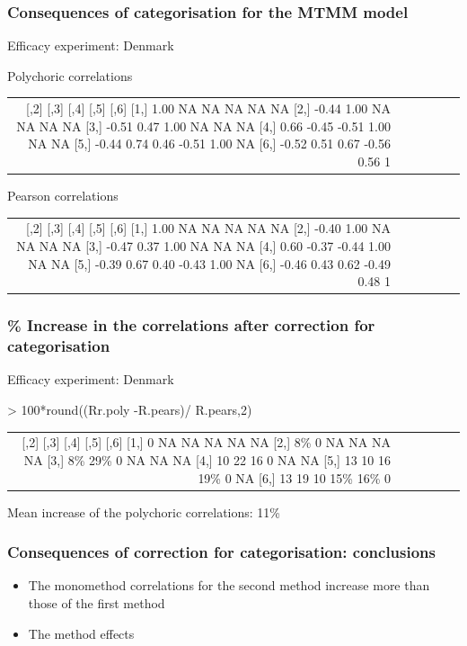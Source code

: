 \documentclass{beamer}
\begin{document}
\begin{frame}
\frametitle{Consequences of categorisation for the MTMM model}

Efficacy experiment: Denmark

Polychoric correlations

\begin{tabular}{rrrrrr}
 \hline
      [,1]  [,2]  [,3]  [,4] [,5] [,6]
[1,]  1.00    NA    NA    NA   NA   NA
[2,] -0.44  1.00    NA    NA   NA   NA
[3,] -0.51  0.47  1.00    NA   NA   NA
[4,]  0.66 -0.45 -0.51  1.00   NA   NA
[5,] -0.44  0.74  0.46 -0.51 1.00   NA
[6,] -0.52  0.51  0.67 -0.56 0.56    1
 \hline
 \end{tabular} 
 
Pearson correlations

\begin{tabular}{rrrrrr}
 \hline
      [,1]  [,2]  [,3]  [,4] [,5] [,6]
[1,]  1.00    NA    NA    NA   NA   NA
[2,] -0.40  1.00    NA    NA   NA   NA
[3,] -0.47  0.37  1.00    NA   NA   NA
[4,]  0.60 -0.37 -0.44  1.00   NA   NA
[5,] -0.39  0.67  0.40 -0.43 1.00   NA
[6,] -0.46  0.43  0.62 -0.49 0.48    1
 \hline
 \end{tabular}
\end{frame}

\begin{frame}
\frametitle{\% Increase in the correlations after correction for categorisation}

Efficacy experiment: Denmark

> 100*round((Rr.poly -R.pears)/ R.pears,2)

\begin{tabular}{rrrrrr}
\hline
     [,1] [,2] [,3] [,4] [,5] [,6]
[1,]    0   NA   NA   NA   NA   NA
[2,]    8\%    0   NA   NA   NA   NA
[3,]    8\%   29\%    0   NA   NA   NA
[4,]   10   22   16    0   NA   NA
[5,]   13   10   16   19\%    0   NA
[6,]   13   19   10   15\%   16\%    0
\hline
 \end{tabular}
 
Mean increase of the polychoric correlations: 11\%


\end{frame}

\begin{frame}
\frametitle{Consequences of correction for categorisation: conclusions}

	\begin{itemize}
		\item The monomethod correlations for the second method increase more than those of the first method
		\item The method effects 
	\end{itemize}
 
\end{frame}
\end{document}
